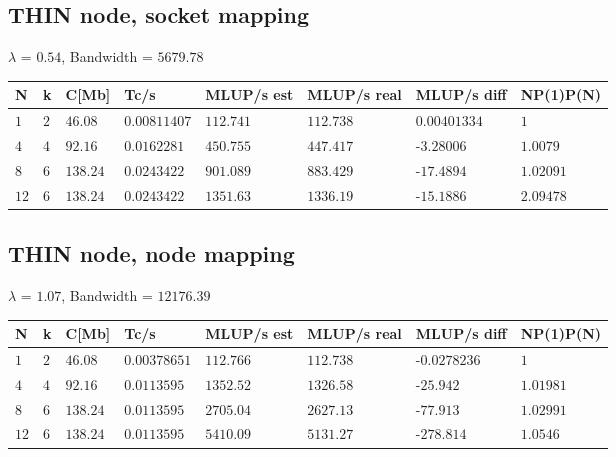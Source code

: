 \documentclass[11pt,a4paper]{article}
\begin{document}
\subsection*{THIN node, socket mapping}
$\lambda$ = $0.54$, Bandwidth = $5679.78$
\begin{table}[H]
    \centering
    \begin{tabular}{|l|l|l|l|l|l|l|l|}
    \toprule
    N 		& k 	& C[Mb] 	& Tc/s 			& MLUP/s est 	& MLUP/s real 	& MLUP/s diff  & NP(1)P(N) \\
    \midrule
    $1$ 	& $2$ 	& $46.08$ 	& $0.00811407$ 	& $112.741$ 	& $112.738$ 	&$0.00401334$ & $1$ \\
    $4$ 	& $4$ 	& $92.16$ 	& $0.0162281$ 	& $450.755$ 	& $447.417$ 	&-$3.28006$ & $1.0079$ \\
    $8$ 	& $6$ 	& $138.24$ 	& $0.0243422$ 	& $901.089$ 	& $883.429$ 	&-$17.4894$ & $1.02091$ \\
    $12$ 	& $6$ 	& $138.24$ 	& $0.0243422$ 	& $1351.63$ 	& $1336.19$ 	&-$15.1886$ & $2.09478$ \\
    \bottomrule
    \end{tabular}
\end{table}
\subsection*{THIN node, node mapping}
$\lambda$ = $1.07$, Bandwidth = $12176.39$
\begin{table}[H]
    \centering
    \begin{tabular}{|l|l|l|l|l|l|l|l|}
    \toprule
    N 		& k 	& C[Mb] 	& Tc/s 			& MLUP/s est 	& MLUP/s real 	& MLUP/s diff  & NP(1)P(N) \\
    \midrule
    $1$ 	& $2$ 	& $46.08$ 	& $0.00378651$ 	& $112.766$ 	& $112.738$ 	&-$0.0278236$ & $1$ \\
    $4$ 	& $4$ 	& $92.16$ 	& $0.0113595$ 	& $1352.52$ 	& $1326.58$ 	&-$25.942$ & $1.01981$ \\
    $8$ 	& $6$ 	& $138.24$ 	& $0.0113595$ 	& $2705.04$ 	& $2627.13$ 	&-$77.913$ & $1.02991$ \\
    $12$ 	& $6$ 	& $138.24$ 	& $0.0113595$ 	& $5410.09$ 	& $5131.27$ 	&-$278.814$ & $1.0546$ \\
    \bottomrule
    \end{tabular}
\end{table}
\end{document}
